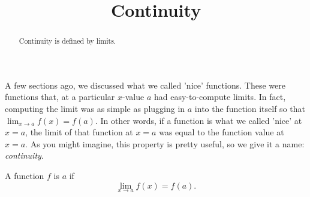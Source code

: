 \documentclass{ximera}
\title[Dig-In:]{Continuity}
\begin{document}
\begin{abstract}
Continuity is defined by limits. 
\end{abstract}
\maketitle

A few sections ago, we discussed what we called 'nice' functions.  These were functions that, at a particular $x$-value $a$ had easy-to-compute limits.  In fact, computing the limit was as simple as plugging in $a$ into the function itself so that $ \lim_{x\to a} f(x) = f(a).$
In other words, if a function is what we called 'nice' at $x=a$, the limit of that function at $x=a$ was equal to the function value at $x=a$.  As you might imagine, this property is pretty useful, so we give it a name: \textit{continuity}. 

\begin{definition}
  A function $f$ is  $a$ if
  \[
  \lim_{x\to a}f(x) = f(a).
  \]
\end{definition}
\end{document}
